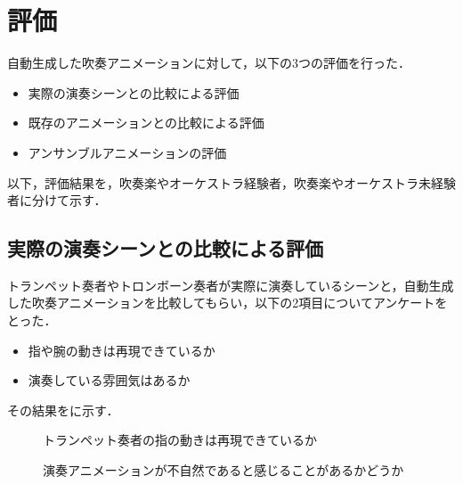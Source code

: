 \section{評価} \label{sec:review}
自動生成した吹奏アニメーションに対して，以下の3つの評価を行った．
\begin{itemize}
	\item 実際の演奏シーンとの比較による評価
	\item 既存のアニメーションとの比較による評価
	\item アンサンブルアニメーションの評価
\end{itemize}
以下，評価結果を，吹奏楽やオーケストラ経験者，吹奏楽やオーケストラ未経験者に分けて示す．

\subsection{実際の演奏シーンとの比較による評価}
トランペット奏者やトロンボーン奏者が実際に演奏しているシーンと，自動生成した吹奏アニメーションを比較してもらい，以下の2項目についてアンケートをとった．
\begin{itemize}
	\item 指や腕の動きは再現できているか
	\item 演奏している雰囲気はあるか
\end{itemize}
その結果をに示す．
\begin{figure}[t]
	\centering
	\hspace{2mm}
	\caption{トランペット奏者の指の動きは再現できているか}
	\label{fig:Q1-tp}
\end{figure}

\begin{figure}[t]
	\centering
	\caption{演奏アニメーションが不自然であると感じることがあるかどうか}
	\label{fig:Q1-tb}
\end{figure}

